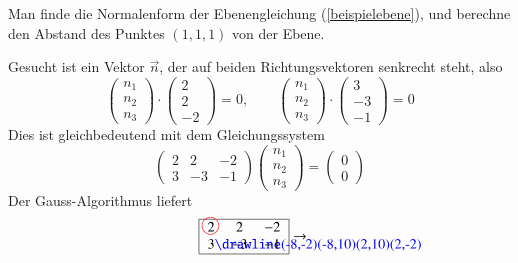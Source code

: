 \begin{beispiel}
Man finde die Normalenform der Ebenengleichung (\ref{beispielebene}),
und berechne den Abstand des Punktes $(1,1,1)$ von der Ebene.

\medskip

{\parindent 0pt Gesucht ist ein Vektor $\vec n$, der auf beiden
Richtungsvektoren senkrecht steht, also}
\begin{equation}
\begin{pmatrix}n_1\\n_2\\n_3\end{pmatrix}
\cdot
\begin{pmatrix}2\\2\\-2\end{pmatrix}
=0,
\qquad
\begin{pmatrix}n_1\\n_2\\n_3\end{pmatrix}
\cdot
\begin{pmatrix}3\\-3\\-1\end{pmatrix}
=0
\label{gleichungen-fuer-normale}
\end{equation}
Dies ist gleichbedeutend mit dem Gleichungssystem
\[
\begin{pmatrix}
2&2&-2\\
3&-3&-1
\end{pmatrix}
\begin{pmatrix}n_1\\n_2\\n_3\end{pmatrix}
=\begin{pmatrix}0\\0 \end{pmatrix}
\]
Der Gauss-Algorithmus liefert
\begin{align*}
\begin{tabular}{|>{$}c<{$}>{$}c<{$}>{$}c<{$}|}
\hline
2%
\begin{picture}(0,0)
\color{red}\put(-3,4){\circle{12}}
\end{picture}%
&2&-2\\
3%
\begin{picture}(0,0)%
\color{blue}\drawline(-8,-2)(-8,10)(2,10)(2,-2)
\end{picture}%
&-3&-1\\
\hline
\end{tabular}
&\rightarrow

\end{align*}
\end{beispiel}
